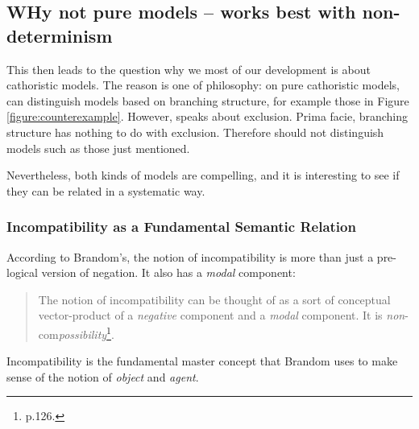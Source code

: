 \subsection{WHy not pure models -- works best with non-determinism}

This then leads to the question why we most of our development is
about cathoristic models. The reason is one of philosophy: on pure
cathoristic models, \cathoristic{} can distinguish models based on
branching structure, for example those in Figure
\ref{figure:counterexample}. However, \cathoristic{} speaks about
exclusion. Prima facie, branching structure has nothing to do with
exclusion. Therefore \cathoristic{} should not distinguish models such
as those just mentioned.

Nevertheless, both kinds of models are compelling, and it is
interesting to see if they can be related in a systematic way.



\subsubsection{Incompatibility as a Fundamental Semantic Relation}
According to Brandom's, the notion of incompatibility is more than just a pre-logical version of negation. 
It also has a \emph{modal} component:
\begin{quote}
The notion of incompatibility can be thought of as a sort of conceptual vector-product of a \emph{negative} component and a \emph{modal} component. It is \emph{non}-com\emph{possibility}\footnote{\cite{brandom} p.126.}.
\end{quote}
Incompatibility is the fundamental master concept that Brandom uses to make sense of the notion of \emph{object} and \emph{agent}.

